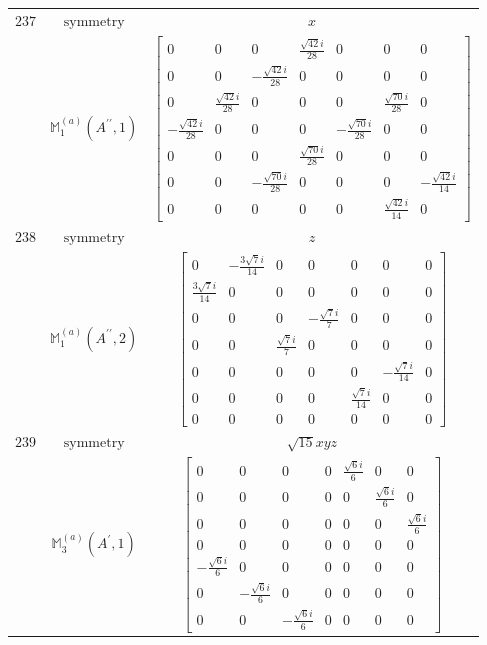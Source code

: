 \documentclass[fleqn,8pt,landscape]{jsarticle}
\begin{document}
\begin{longtable}{ccc}
$ 237 $ & $ \text{symmetry} $ & $ x $ \\
$  $ & $ \mathbb{M}_{1}^{(a)}(A^{\prime\prime},1) $ & $ \begin{bmatrix} 0 & 0 & 0 & \frac{\sqrt{42} i}{28} & 0 & 0 & 0 \\ 0 & 0 & - \frac{\sqrt{42} i}{28} & 0 & 0 & 0 & 0 \\ 0 & \frac{\sqrt{42} i}{28} & 0 & 0 & 0 & \frac{\sqrt{70} i}{28} & 0 \\ - \frac{\sqrt{42} i}{28} & 0 & 0 & 0 & - \frac{\sqrt{70} i}{28} & 0 & 0 \\ 0 & 0 & 0 & \frac{\sqrt{70} i}{28} & 0 & 0 & 0 \\ 0 & 0 & - \frac{\sqrt{70} i}{28} & 0 & 0 & 0 & - \frac{\sqrt{42} i}{14} \\ 0 & 0 & 0 & 0 & 0 & \frac{\sqrt{42} i}{14} & 0 \end{bmatrix} $ \\ \hline
$ 238 $ & $ \text{symmetry} $ & $ z $ \\
$  $ & $ \mathbb{M}_{1}^{(a)}(A^{\prime\prime},2) $ & $ \begin{bmatrix} 0 & - \frac{3 \sqrt{7} i}{14} & 0 & 0 & 0 & 0 & 0 \\ \frac{3 \sqrt{7} i}{14} & 0 & 0 & 0 & 0 & 0 & 0 \\ 0 & 0 & 0 & - \frac{\sqrt{7} i}{7} & 0 & 0 & 0 \\ 0 & 0 & \frac{\sqrt{7} i}{7} & 0 & 0 & 0 & 0 \\ 0 & 0 & 0 & 0 & 0 & - \frac{\sqrt{7} i}{14} & 0 \\ 0 & 0 & 0 & 0 & \frac{\sqrt{7} i}{14} & 0 & 0 \\ 0 & 0 & 0 & 0 & 0 & 0 & 0 \end{bmatrix} $ \\ \hline
$ 239 $ & $ \text{symmetry} $ & $ \sqrt{15} x y z $ \\
$  $ & $ \mathbb{M}_{3}^{(a)}(A^{\prime},1) $ & $ \begin{bmatrix} 0 & 0 & 0 & 0 & \frac{\sqrt{6} i}{6} & 0 & 0 \\ 0 & 0 & 0 & 0 & 0 & \frac{\sqrt{6} i}{6} & 0 \\ 0 & 0 & 0 & 0 & 0 & 0 & \frac{\sqrt{6} i}{6} \\ 0 & 0 & 0 & 0 & 0 & 0 & 0 \\ - \frac{\sqrt{6} i}{6} & 0 & 0 & 0 & 0 & 0 & 0 \\ 0 & - \frac{\sqrt{6} i}{6} & 0 & 0 & 0 & 0 & 0 \\ 0 & 0 & - \frac{\sqrt{6} i}{6} & 0 & 0 & 0 & 0 \end{bmatrix} $ \\ \hline

\end{longtable}
\end{document}

